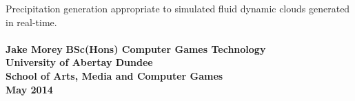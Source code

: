 \doublespacing
\begin{titlepage}
   \begin{center}
     Precipitation generation appropriate to simulated fluid dynamic clouds generated in real-time.\\
     \textbf{\\Jake Morey}
     \vfill
     \singlespacing
     \textbf{
     BSc(Hons) Computer Games Technology
     \\University of Abertay Dundee
     \\School of Arts, Media and Computer Games
     \\May 2014}
   \end{center}
\end{titlepage}
\doublespacing
\thispagestyle{empty}
\setcounter{page}{0}
\clearpage

